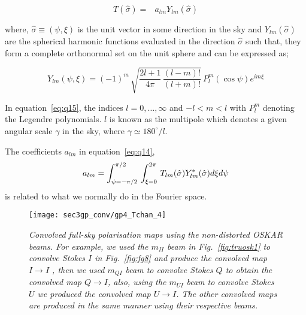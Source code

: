 \documentclass[fleqn,usenatbib]{mnras}
\begin{document}
 \begin{equation}  	\label{eq:q14} 
                    T(\hat{\sigma}) = \mathop{\sum_{l\, = 0}^{\infty}\sum_{m\, = -l}^{l}} \, a_{lm}Y_{lm}(\hat{\sigma})
     \end{equation}

\noindent
where, $\hat{\sigma} \equiv (\psi, \xi)$ is the unit vector in some direction in the sky and $Y_{lm}(\hat{\sigma})$ are the spherical harmonic functions evaluated in the direction $\hat{\sigma}$ such that, they form a complete orthonormal set on the unit sphere and can be expressed as;

\begin{equation} 	\label{eq:q15}
            Y_{lm}(\psi ,\xi) = (-1)^m \, \sqrt{\frac{2l + 1}{4\pi} \, \frac{(l - m)!}{(l + m)!}}\, P_{l}^{m}(\cos \psi)e^{im\xi} 
		      \end{equation}

\noindent
In equation~\eqref{eq:q15}, the indices $l = 0, \dots, \infty$ and $-l < m < l$ with $P_{l}^{m}$ denoting the Legendre polynomials. $l$ is known as the multipole which denotes a given angular scale $\gamma$ in the sky, where $\gamma \simeq 180^{\circ}/l$.

\noindent
The coefficients $ a_{lm}$ in equation~\eqref{eq:q14},
 \begin{equation} 	  \label{eq:q16}
         a_{lm} = \int_{\psi = - \pi/2}^{\pi/2} \,\int_{\xi = 0}^{2\pi} \, T_{lm}(\hat{\sigma})Y_{lm}^{*}(\hat{\sigma})\mathnormal{{d\xi}{d\psi}}                            
		      \end{equation}
%
\noindent
is related to what we normally do in the Fourier space.\\
%
 \begin{figure*}
\begin{minipage}[H]{\linewidth}
      \texttt{[image: sec3gp\_conv/gp4\_Tchan\_4]}      
      \end{minipage} 
    \caption{\textit{Convolved full-sky polarisation maps using the non-distorted OSKAR beams. For example, we used the $m_{II}$ beam in Fig.~\ref{fig:truosk1} to convolve Stokes $I$ in Fig.~\ref{fig:fg8} and produce the convolved map $I \rightarrow I$ , then we used $m_{QI}$ beam to convolve Stokes $Q$ to obtain the convolved map $Q \rightarrow I$, also, using the $m_{UI}$ beam to convolve Stokes $U$ we produced the convolved map $U \rightarrow I$. The other convolved maps are produced in the same manner using their respective beams.}}\label{fig:fg9}
\end{figure*}
\end{document}
